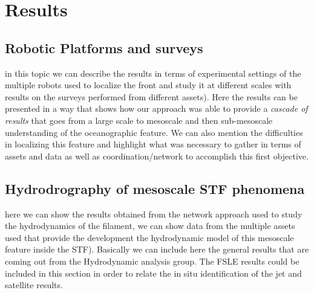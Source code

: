 \section*{Results}
\subsection{Robotic Platforms and surveys }

in this topic we can describe the results in terms of experimental settings of the multiple robots used to localize the front and study it at different scales with results on the surveys performed from different assets). Here the results can be presented in a way that shows how our approach was able to provide a \emph{cascade of results} that goes from a large scale to mesoscale and then sub-mesoscale understanding of the oceanographic feature. 
We can also mention the difficulties in localizing this feature and highlight what was necessary to gather in terms of assets and data as well as coordination/network to accomplish this first objective.\\

\begin{figure}
    \centering
    \label{fig:block}
\end{figure}

\subsection{Hydrodrography of mesoscale STF phenomena}

here we can show the results obtained from the network approach used to study the hydrodynamics of the filament, we can show data from the multiple assets used that provide the development the hydrodynamic model of this mesoscale feature inside the STF). Basically we can include here the general results that are coming out from the Hydrodynamic analysis group. 
The FSLE results could be included in this section in order to relate the in situ identification of the jet and satellite results.\\

